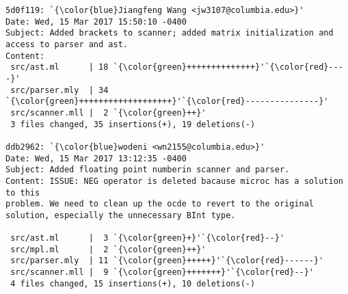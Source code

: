 \begin{lstlisting}
5d0f119: `{\color{blue}Jiangfeng Wang <jw3107@columbia.edu>}'
Date: Wed, 15 Mar 2017 15:50:10 -0400
Subject: Added brackets to scanner; added matrix initialization and access to parser and ast.
Content: 
 src/ast.ml      | 18 `{\color{green}++++++++++++++}'`{\color{red}----}'
 src/parser.mly  | 34 `{\color{green}+++++++++++++++++++}'`{\color{red}---------------}'
 src/scanner.mll |  2 `{\color{green}++}'
 3 files changed, 35 insertions(+), 19 deletions(-)

ddb2962: `{\color{blue}wodeni <wn2155@columbia.edu>}'
Date: Wed, 15 Mar 2017 13:12:35 -0400
Subject: Added floating point numberin scanner and parser.
Content: ISSUE: NEG operator is deleted bacause microc has a solution to this
problem. We need to clean up the ocde to revert to the original
solution, especially the unnecessary BInt type.

 src/ast.ml      |  3 `{\color{green}+}'`{\color{red}--}'
 src/mpl.ml      |  2 `{\color{green}++}'
 src/parser.mly  | 11 `{\color{green}+++++}'`{\color{red}------}'
 src/scanner.mll |  9 `{\color{green}+++++++}'`{\color{red}--}'
 4 files changed, 15 insertions(+), 10 deletions(-)


\end{lstlisting}
